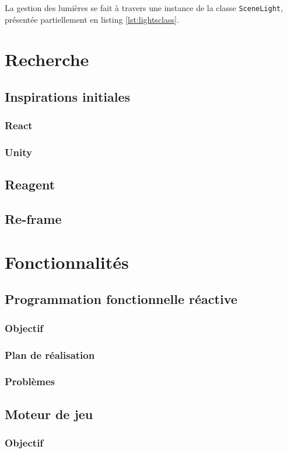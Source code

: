\documentclass{report}
\begin{document}
La gestion des lumières se fait à travers une instance de la classe
\lstinline|SceneLight|, présentée partiellement en listing \ref{lst:lightsclass}.

\chapter{Recherche}
\section{Inspirations initiales}
\subsection{React}

\subsection{Unity}
\section{Reagent}
\section{Re-frame}

\chapter{Fonctionnalités}
\section{Programmation fonctionnelle réactive}
\subsection{Objectif}
\subsection{Plan de réalisation}
\subsection{Problèmes}
\section{Moteur de jeu}
\subsection{Objectif}
\end{document}
